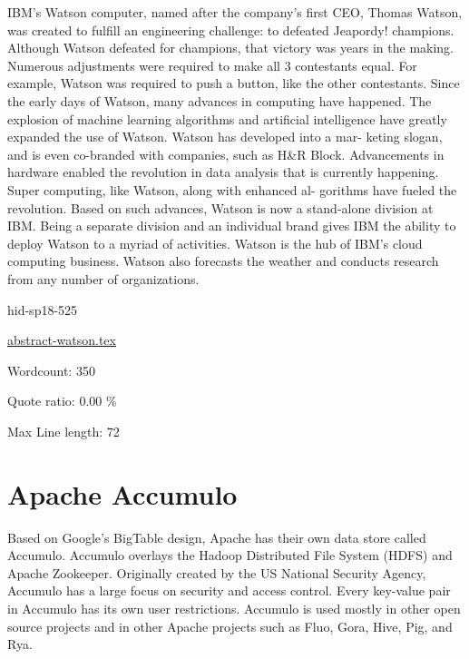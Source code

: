 IBM's Watson computer, named after the company's first CEO, Thomas
Watson, was created to fulfill an engineering challenge: to defeated
Jeapordy! champions\cite{hid-sp18-525-watson}. Although Watson defeated
for champions, that victory was years in the making.  Numerous
adjustments were required to make all 3 contestants equal.  For
example, Watson was required to push a button, like the other
contestants\cite{hid-sp18-525-watson}. Since the early days of Watson,
many advances in computing have happened. The explosion of machine
learning algorithms and artificial intelligence have greatly expanded
the use of Watson. Watson has developed into a mar- keting slogan, and
is even co-branded with companies, such as H\&R
Block\cite{hid-sp18-525-watson}. Advancements in hardware enabled the
revolution in data analysis that is currently happening. Super
computing, like Watson, along with enhanced al- gorithms have fueled
the revolution. Based on such advances, Watson is now a stand-alone
division at IBM\cite{hid-sp18-525-watson}. Being a separate division and
an individual brand gives IBM the ability to deploy Watson to a myriad
of activities. Watson is the hub of IBM's cloud computing business.
Watson also forecasts the weather and conducts research from any
number of organizations\cite{hid-sp18-525-watson}.



\begin{IU}

hid-sp18-525

\href{https://github.com/cloudmesh-community/hid-sp18-525/blob/master//technology/abstract-watson.tex}{abstract-watson.tex}

 

Wordcount: 350


Quote ratio: 0.00 \%
 
Max Line length: 72
\end{IU}

\section{Apache Accumulo}

Based on Google's BigTable design, Apache has their own data store called
Accumulo\cite{hid-sp18-526-www-apache-accumulo}. Accumulo overlays the
Hadoop Distributed File System (HDFS) and Apache Zookeeper. Originally
created by the US National Security Agency, Accumulo has a large focus on
security and access control. Every key-value pair in Accumulo has its own
user restrictions. Accumulo is used mostly in other open source projects
and in other Apache projects such as Fluo, Gora, Hive, Pig, and Rya.


